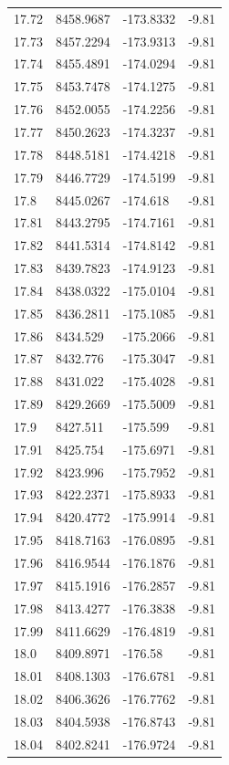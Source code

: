 \begin{table}[H]
\begin{tabular}{llll}
17.72 & 8458.9687 & -173.8332 & -9.81 \\
17.73 & 8457.2294 & -173.9313 & -9.81 \\
17.74 & 8455.4891 & -174.0294 & -9.81 \\
17.75 & 8453.7478 & -174.1275 & -9.81 \\
17.76 & 8452.0055 & -174.2256 & -9.81 \\
17.77 & 8450.2623 & -174.3237 & -9.81 \\
17.78 & 8448.5181 & -174.4218 & -9.81 \\
17.79 & 8446.7729 & -174.5199 & -9.81 \\
17.8 & 8445.0267 & -174.618 & -9.81 \\
17.81 & 8443.2795 & -174.7161 & -9.81 \\
17.82 & 8441.5314 & -174.8142 & -9.81 \\
17.83 & 8439.7823 & -174.9123 & -9.81 \\
17.84 & 8438.0322 & -175.0104 & -9.81 \\
17.85 & 8436.2811 & -175.1085 & -9.81 \\
17.86 & 8434.529 & -175.2066 & -9.81 \\
17.87 & 8432.776 & -175.3047 & -9.81 \\
17.88 & 8431.022 & -175.4028 & -9.81 \\
17.89 & 8429.2669 & -175.5009 & -9.81 \\
17.9 & 8427.511 & -175.599 & -9.81 \\
17.91 & 8425.754 & -175.6971 & -9.81 \\
17.92 & 8423.996 & -175.7952 & -9.81 \\
17.93 & 8422.2371 & -175.8933 & -9.81 \\
17.94 & 8420.4772 & -175.9914 & -9.81 \\
17.95 & 8418.7163 & -176.0895 & -9.81 \\
17.96 & 8416.9544 & -176.1876 & -9.81 \\
17.97 & 8415.1916 & -176.2857 & -9.81 \\
17.98 & 8413.4277 & -176.3838 & -9.81 \\
17.99 & 8411.6629 & -176.4819 & -9.81 \\
18.0 & 8409.8971 & -176.58 & -9.81 \\
18.01 & 8408.1303 & -176.6781 & -9.81 \\
18.02 & 8406.3626 & -176.7762 & -9.81 \\
18.03 & 8404.5938 & -176.8743 & -9.81 \\
18.04 & 8402.8241 & -176.9724 & -9.81 \\

\end{tabular}
\end{table}
